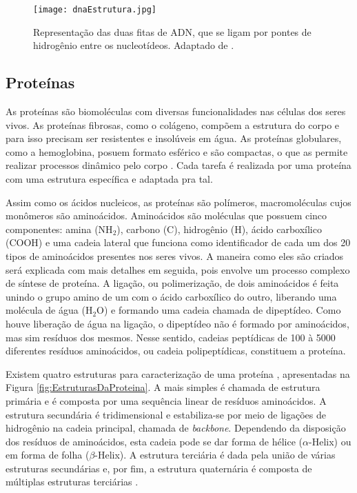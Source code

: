 \begin{figure}[h]
    \centering
    \texttt{[image: dnaEstrutura.jpg]}
    \caption{Representação das duas fitas de ADN, que se ligam por pontes de hidrogênio entre os nucleotídeos. Adaptado de \cite{dnadiscovery08}.}
    \label{fig:EstruturasDoDNA}
\end{figure} 



\subsection{Proteínas} \label{proteinas}

\indent As proteínas são biomoléculas com diversas funcionalidades nas células dos seres vivos. As proteínas fibrosas, como o colágeno, compõem a estrutura do corpo e para isso precisam ser resistentes e insolúveis em água. As proteínas globulares, como a hemoglobina, posuem formato esférico e são compactas, o que as permite realizar processos dinâmico pelo corpo \cite{LauraProteinas07}. Cada tarefa é realizada por uma proteína com uma estrutura específica e adaptada pra tal.

\indent Assim como os ácidos nucleicos, as proteínas são polímeros, macromoléculas cujos monômeros são aminoácidos. Aminoácidos são moléculas que possuem cinco componentes: amina (NH$_{2}$), carbono (C), hidrogênio (H), ácido carboxílico (COOH) e uma cadeia lateral que funciona como identificador de cada um dos 20 tipos de aminoácidos presentes nos seres vivos. A maneira como eles são criados será explicada com mais detalhes em seguida, pois envolve um processo complexo de síntese de proteína. A ligação, ou polimerização, de dois aminoácidos é feita unindo o grupo amino de um com o ácido carboxílico do outro, liberando uma molécula de água (H$_{2}$O) e formando uma cadeia chamada de dipeptídeo. Como houve liberação de água na ligação, o dipeptídeo não é formado por aminoácidos, mas sim resíduos dos mesmos. Nesse sentido, cadeias peptídicas de 100 à 5000 diferentes resíduos aminoácidos, ou cadeia polipeptídicas,  constituem a proteína.

\indent Existem quatro estruturas para caracterização de uma proteína \cite{setubal97}, apresentadas na Figura \ref{fig:EstruturasDaProteina}. A mais simples é chamada de estrutura primária e é composta por uma sequência linear de resíduos aminoácidos. A estrutura secundária é tridimensional e estabiliza-se por meio de ligações de hidrogênio na cadeia principal, chamada de \textit{backbone}. Dependendo da disposição dos resíduos de aminoácidos, esta cadeia pode se dar forma de hélice ($\alpha$-Helix) ou em forma de folha ($\beta$-Helix). A estrutura terciária é dada pela união de várias estruturas secundárias e, por fim, a estrutura quaternária é composta de múltiplas estruturas terciárias \cite{drug09}.

